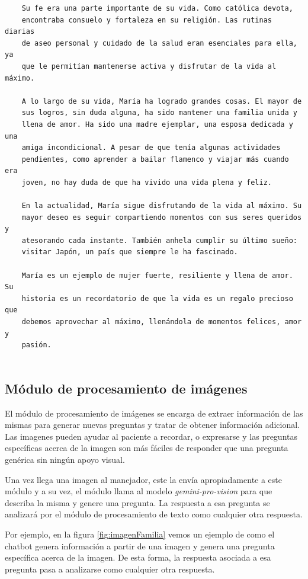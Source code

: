 \begin{verbatim}
	Su fe era una parte importante de su vida. Como católica devota,
	encontraba consuelo y fortaleza en su religión. Las rutinas diarias
	de aseo personal y cuidado de la salud eran esenciales para ella, ya
	que le permitían mantenerse activa y disfrutar de la vida al máximo.
	
	A lo largo de su vida, María ha logrado grandes cosas. El mayor de
	sus logros, sin duda alguna, ha sido mantener una familia unida y
	llena de amor. Ha sido una madre ejemplar, una esposa dedicada y una
	amiga incondicional. A pesar de que tenía algunas actividades
	pendientes, como aprender a bailar flamenco y viajar más cuando era
	joven, no hay duda de que ha vivido una vida plena y feliz.
	
	En la actualidad, María sigue disfrutando de la vida al máximo. Su
	mayor deseo es seguir compartiendo momentos con sus seres queridos y
	atesorando cada instante. También anhela cumplir su último sueño:
	visitar Japón, un país que siempre le ha fascinado.
	
	María es un ejemplo de mujer fuerte, resiliente y llena de amor. Su
	historia es un recordatorio de que la vida es un regalo precioso que
	debemos aprovechar al máximo, llenándola de momentos felices, amor y
	pasión.
	
\end{verbatim}

\subsection{Módulo de procesamiento de imágenes}
\label{procesamientoimagenes}
El módulo de procesamiento de imágenes se encarga de extraer información de las mismas para generar nuevas preguntas y tratar de obtener información adicional. Las imagenes pueden ayudar al paciente a recordar, o expresarse y las preguntas específicas acerca de la imagen son más fáciles de responder que una pregunta genérica sin ningún apoyo visual. 

Una vez llega una imagen al manejador, este la envía apropiadamente a este módulo y a su vez, el módulo llama al modelo  \textit{gemini-pro-vision} para que describa la misma y genere una pregunta. La respuesta a esa pregunta se analizará por el módulo de procesamiento de texto como cualquier otra respuesta. 

Por ejemplo, en la figura \ref{fig:imagenFamilia} vemos un ejemplo de como el chatbot genera información a partir de una imagen y genera una pregunta específica acerca de la imagen. De esta forma, la respuesta asociada a esa pregunta pasa a analizarse como cualquier otra respuesta. 

